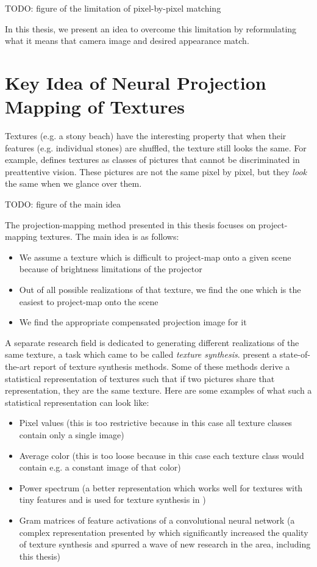 {\color{red} TODO: figure of the limitation of pixel-by-pixel matching}

In this thesis, we present an idea to overcome this limitation by reformulating what it means that camera image and desired appearance match.

\section{Key Idea of Neural Projection Mapping of Textures}
\label{section:intro-key_idea}

Textures (e.g. a stony beach) have the interesting property that when their features (e.g. individual stones) are shuffled, the texture still looks the same. For example, \citet*{Julesz1995} defines textures as classes of pictures that cannot be discriminated in preattentive vision. These pictures are not the same pixel by pixel, but they \textit{look} the same when we glance over them.

{\color{red} TODO: figure of the main idea}

The projection-mapping method presented in this thesis focuses on project-mapping textures. The main idea is as follows:

\begin{itemize}
    \item We assume a texture which is difficult to project-map onto a given scene because of brightness limitations of the projector
    \item Out of all possible realizations of that texture, we find the one which is the easiest to project-map onto the scene
    \item We find the appropriate compensated projection image for it
\end{itemize}

A separate research field is dedicated to generating different realizations of the same texture, a task which came to be called \textit{texture synthesis}. \citet*{Raad2018} present a state-of-the-art report of texture synthesis methods. Some of these methods derive a statistical representation of textures such that if two pictures share that representation, they are the same texture. Here are some examples of what such a statistical representation can look like:

\begin{itemize}
    \item Pixel values (this is too restrictive because in this case all texture classes contain only a single image)
    \item Average color (this is too loose because in this case each texture class would contain e.g. a constant image of that color)
    \item Power spectrum (a better representation which works well for textures with tiny features and is used for texture synthesis in \citet*{Galerne2011})
    \item Gram matrices of feature activations of a convolutional neural network (a complex representation presented by \citet*{Gatys2015} which significantly increased the quality of texture synthesis and spurred a wave of new research in the area, including this thesis)
\end{itemize}

